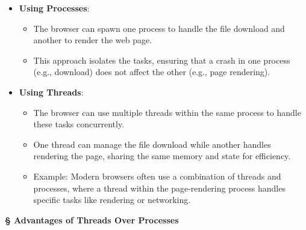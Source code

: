 \documentclass[a4paper]{book}
\newcommand{\sfbf}[1]{{\normalsize\textsf{\textbf{§ #1}}}}
\begin{document}
\begin{itemize}
\item 
\textbf{Using Processes}:

\begin{itemize}
\item 
The browser can spawn one process to handle the file download and another to render the web page.

\item 
This approach isolates the tasks, ensuring that a crash in one process (e.g., download) does not affect the other (e.g., page rendering).

\end{itemize}

\item 
\textbf{Using Threads}:
\begin{itemize}
\item 
The browser can use multiple threads within the same process to handle these tasks concurrently.

\item 
One thread can manage the file download while another handles rendering the page, sharing the same memory and state for efficiency.

\item 
Example: Modern browsers often use a combination of threads and processes, where a thread within the page-rendering process handles specific tasks like rendering or networking.

\end{itemize}

\end{itemize}

\hrulefill

\sfbf{Advantages of Threads Over Processes}
\end{document}
